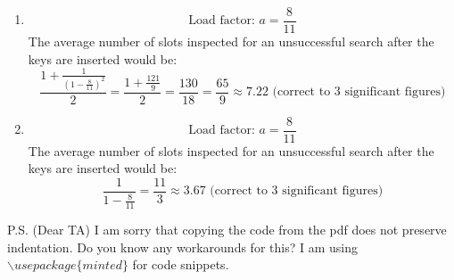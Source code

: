 \documentclass{article}
\begin{document}
\begin{enumerate}
\begin{enumerate}[label=(\alph*)]
        \item
        \[
        \text{Load factor: } a = \frac{8}{11}
        \]
        The average number of slots inspected for an unsuccessful search after the keys are inserted would be:
        \[
        \frac{1+\frac{1}{(1-\frac{8}{11})^2}}{2} = \frac{1+\frac{121}{9}}{2} = \frac{130}{18} = \frac{65}{9} \approx 7.22 \text{ (correct to 3 significant figures)}
        \]

        \item
        \[
        \text{Load factor: } a = \frac{8}{11}
        \]
        The average number of slots inspected for an unsuccessful search after the keys are inserted would be:
        \[
        \frac{1}{1-\frac{8}{11}} = \frac{11}{3} \approx 3.67 \text{ (correct to 3 significant figures)}
        \]
    \end{enumerate}

\end{enumerate}

P.S. (Dear TA) I am sorry that copying the code from the pdf does not preserve indentation. Do you know any workarounds for this? I am using $\backslash usepackage\{minted\}$ for code snippets.
\end{document}
